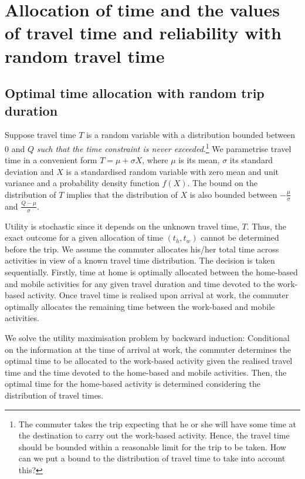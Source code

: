 \documentclass[12pt,a4paper,british]{article}
\begin{document}



\section{Allocation of time and the values of travel time and reliability with random travel time }

\subsection*{Optimal time allocation with random trip duration}

Suppose travel time $T$ is a random variable with a distribution bounded between $0$ and $Q$ \textit{such that the time constraint is never exceeded}.\footnote{The commuter takes the trip expecting that he or she will have some time at the destination to carry out the work-based activity. Hence, the travel time should be bounded within a reasonable limit for the trip to be taken. How can we put a bound to the distribution of travel time to take into account this?} We parametrise travel time in a convenient form $T=\mu+\sigma X$, where $\mu$ is its mean, $\sigma$ its standard deviation and $X$ is a standardised random variable with zero mean and unit variance and a probability density function $f\left(X\right)$. The bound on the distribution of $T$ implies that the distribution of $X$ is also bounded between $-\frac{\mu}{\sigma}$ and $\frac{Q-\mu}{\sigma}$. 

Utility is stochastic since it depends on the unknown travel time, $T$. Thus, the exact outcome for a given allocation of time $\left(t_{h},t_{w}\right)$ cannot be determined before the trip. We assume the commuter allocates his/her total time across activities in view of a known travel time distribution. The decision is taken sequentially. Firstly, time at home is optimally allocated between the home-based and mobile activities for any given travel duration and time devoted to the work-based activity. Once travel time is realised upon arrival at work, the commuter optimally allocates the remaining time between the work-based and mobile activities.

We solve the utility maximisation problem by backward induction: Conditional on the information at the time of arrival at work, the commuter determines the optimal time to be allocated to the work-based activity given the realised travel time and the time devoted to the home-based and mobile activities. Then, the optimal time for the home-based activity is determined considering the distribution of travel times.
\end{document}
